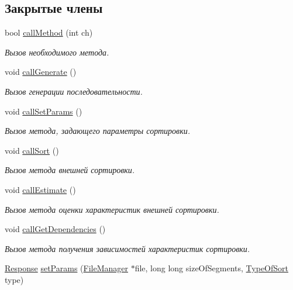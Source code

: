 \subsection*{Закрытые члены}
\begin{DoxyCompactItemize}
\item 
bool \hyperlink{class_user_interface_ad388ff348c0a124038f4ea9756b80041}{call\+Method} (int ch)
\begin{DoxyCompactList}\small\item\em Вызов необходимого метода. \end{DoxyCompactList}\item 
void \hyperlink{class_user_interface_a27c547dadfd5588d5b734e253b2e8a4a}{call\+Generate} ()
\begin{DoxyCompactList}\small\item\em Вызов генерации последовательности. \end{DoxyCompactList}\item 
void \hyperlink{class_user_interface_adcabf6c8f2be4b4ec712c4674156bf59}{call\+Set\+Params} ()
\begin{DoxyCompactList}\small\item\em Вызов метода, задающего параметры сортировки. \end{DoxyCompactList}\item 
void \hyperlink{class_user_interface_a0e03dfecee7e890ad1e076888062d5cb}{call\+Sort} ()
\begin{DoxyCompactList}\small\item\em Вызов метода внешней сортировки. \end{DoxyCompactList}\item 
void \hyperlink{class_user_interface_a7957201b3543ea0561d48bcc0a0d329e}{call\+Estimate} ()
\begin{DoxyCompactList}\small\item\em Вызов метода оценки характеристик внешней сортировки. \end{DoxyCompactList}\item 
void \hyperlink{class_user_interface_a332db63dca89d684f7e9e1272f4c3745}{call\+Get\+Dependencies} ()
\begin{DoxyCompactList}\small\item\em Вызов метода получения зависимостей характеристик сортировки. \end{DoxyCompactList}\item 
\hyperlink{_structures_8h_ab3500e5d3c915d1b5cc58dcab8673fd4}{Response} \hyperlink{class_user_interface_a50f82c57764069c9fcb7557d835135ff}{set\+Params} (\hyperlink{class_file_manager}{File\+Manager} $\ast$file, long long size\+Of\+Segments, \hyperlink{_structures_8h_adbb15722785daaf5166f7ea34323854c}{Type\+Of\+Sort} type)

\end{DoxyCompactItemize}
